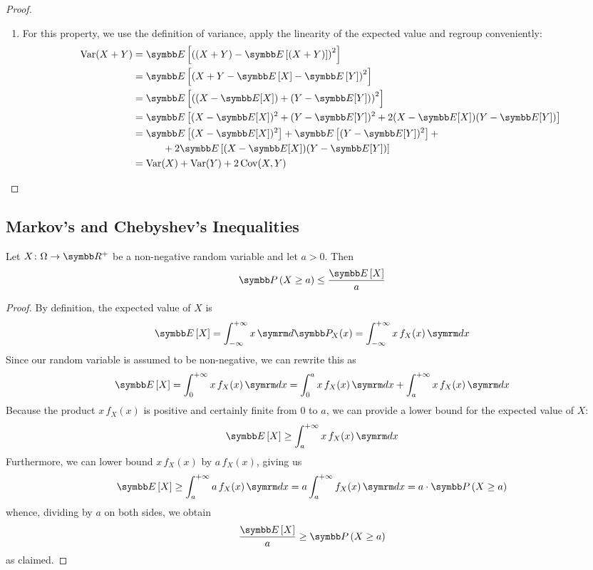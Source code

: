 \begin{proof}
\begin{enumerate}
    \item For this property, we use the definition of variance, apply the linearity of the expected value and regroup conveniently:
    \begin{align*}
        \variance(X + Y) &= \expectedvalue\left[\left(\left(X + Y\right) - \expectedvalue\left[\left(X + Y\right)\right]\right)^2\right] \\
        &= \expectedvalue\left[\left(X + Y - \expectedvalue\left[X\right] - \expectedvalue\left[Y\right]\right)^2\right] \\
        &= \expectedvalue\left[\left((X - \expectedvalue[X]) + (Y - \expectedvalue[Y])\right)^2\right] \\
        &= \expectedvalue\left[(X - \expectedvalue[X])^2 + (Y - \expectedvalue[Y])^2 + 2 (X - \expectedvalue[X]) (Y - \expectedvalue[Y])\right] \\
        &= \expectedvalue\left[(X - \expectedvalue[X])^2\right] + \expectedvalue\left[(Y - \expectedvalue[Y])^2\right] + \\
        &\qquad\quad + 2 \expectedvalue\left[(X - \expectedvalue[X]) (Y - \expectedvalue[Y])\right] \\
        &= \variance(X) + \variance(Y) + 2 \covariance(X, Y)
    \end{align*}
\end{enumerate}
\end{proof}

\subsection*{Markov's and Chebyshev's Inequalities}

\begin{theorem}
Let \(X \colon \Omega \to \reals^+\) be a non-negative random variable and let \(a > 0\). Then
\[
    \probability\left(X \geq a\right) \leq \frac{\expectedvalue\left[X\right]}{a}
\]
\end{theorem}
\begin{proof}
By definition, the expected value of \(X\) is
\[
    \expectedvalue\left[X\right] = \int_{-\infty}^{+\infty} x \diff \probability_X (x) = \int_{-\infty}^{+\infty} x \, f_X (x) \diff x
\]
Since our random variable is assumed to be non-negative, we can rewrite this as
\[
    \expectedvalue\left[X\right] = \int_{0}^{+\infty} x \, f_X (x) \diff x = \int_{0}^{a} x \, f_X (x) \diff x + \int_{a}^{+\infty} x \, f_X (x) \diff x
\]
Because the product \(x \, f_X (x)\) is positive and certainly finite from \(0\) to \(a\), we can provide a lower bound for the expected value of \(X\):
\[
    \expectedvalue\left[X\right] \geq \int_{a}^{+\infty} x \, f_X (x) \diff x
\]
Furthermore, we can lower bound \(x \, f_X (x)\) by \(a \, f_X (x)\), giving us
\[
    \expectedvalue\left[X\right] \geq \int_{a}^{+\infty} a \, f_X (x) \diff x = a \int_{a}^{+\infty} f_X (x) \diff x = a \cdot \probability\left(X \geq a\right)
\]
whence, dividing by \(a\) on both sides, we obtain
\[
    \frac{\expectedvalue\left[X\right]}{a} \geq \probability\left(X \geq a \right)
\]
as claimed.
\end{proof}

